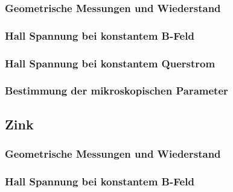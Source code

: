 \subsubsection{Geometrische Messungen und Wiederstand}
\subsubsection{Hall Spannung bei konstantem B-Feld}
\subsubsection{Hall Spannung bei konstantem Querstrom}
\subsubsection{Bestimmung der mikroskopischen Parameter}
\subsection{Zink}
\subsubsection{Geometrische Messungen und Wiederstand}
\subsubsection{Hall Spannung bei konstantem B-Feld}
